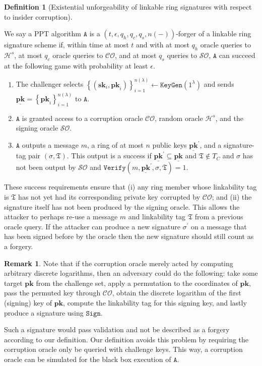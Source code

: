 \documentclass{article}
\theoremstyle{plain}
\theoremstyle{definition}
\newtheorem{remark}{Remark}[section]
\newtheorem{defn}{Definition}[section]
\begin{document}
\begin{defn}[Existential unforgeability of linkable ring signatures with respect to insider corruption]\label{def:unf}

We say a PPT algorithm $\texttt{A}$  is a $(t, \epsilon, q_h, q_c, q_s,  n(-))$-forger of a linkable ring signature scheme if, within time at most $t$ and with at most $q_h$ oracle queries to $\mathcal{H}^s$, at most $q_c$ oracle queries to $\mathcal{CO}$, and at most $q_s$ queries to $\mathcal{SO}$, $\texttt{A}$ can succeed at the following game with probability at least $\epsilon$.
\begin{enumerate}
\item The challenger selects $\left\{(\textbf{sk}_i, \textbf{pk}_i)\right\}_{i=1}^{n(\lambda)} \leftarrow \texttt{KeyGen}(1^\lambda)$ and sends $\underline{\textbf{pk}} = \left\{\textbf{pk}_i\right\}_{i=1}^{n(\lambda)}$ to $\texttt{A}$. 

\item $\texttt{A}$ is granted access to a corruption oracle $\mathcal{CO}$, random oracle $\mathcal{H}^s$, and the signing oracle $\mathcal{SO}$.

\item $\texttt{A}$ outputs a message $m$, a ring of at most $n$ public keys $\underline{\textbf{pk}}^\prime$, and a signature-tag pair $(\sigma, \mathfrak{T})$. This output is a success if $\underline{\textbf{pk}}^\prime \subseteq \underline{\textbf{pk}}$ and $\mathfrak{T} \notin T_C$ and $\sigma$ has not been output by $\mathcal{SO}$ and $\texttt{Verify}(m, \underline{\textbf{pk}}^\prime, \sigma, \mathfrak{T}) = 1$.

\end{enumerate}
\end{defn}

These success requirements ensure that (i) any ring member whose linkability tag is $\mathfrak{T}$ has not yet had its corresponding private key corrupted by $\mathcal{CO}$; and (ii) the signature itself has not been produced by the signing oracle. This allows the attacker to perhaps re-use a message $m$ and linkability tag $\mathfrak{T}$ from a previous oracle query. If the attacker can produce a new signature $\sigma^\prime$ on a message that has been signed before by the oracle then the new signature should still count as a forgery.


\begin{remark}
Note that if the corruption oracle merely acted by computing arbitrary discrete logarithms, then an adversary could do the following: take some target $\textbf{pk}$ from the challenge set, apply a permutation to the coordinates of $\textbf{pk}$, pass the permuted key through $\mathcal{CO}$, obtain the discrete logarithm of the first (signing) key of $\textbf{pk}$, compute the linkability tag for this signing key, and lastly produce a signature using $\texttt{Sign}$. 

Such a signature would pass validation and not be described as a forgery according to our definition. Our definition avoids this problem by requiring the corruption oracle only be queried with challenge keys. This way, a corruption oracle can be simulated for the black box execution of $\texttt{A}$.
\end{remark}
\end{document}
